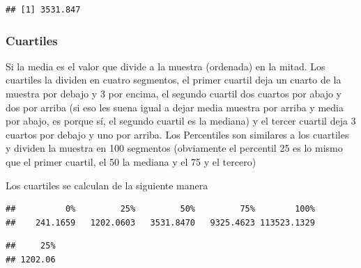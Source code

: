 \documentclass[
]{book}
\newenvironment{Shaded}{\begin{snugshade}}{\end{snugshade}}
\newcommand{\CommentTok}[1]{\textcolor[rgb]{0.56,0.35,0.01}{\textit{#1}}}
\newcommand{\FloatTok}[1]{\textcolor[rgb]{0.00,0.00,0.81}{#1}}
\newcommand{\FunctionTok}[1]{\textcolor[rgb]{0.00,0.00,0.00}{#1}}
\newcommand{\NormalTok}[1]{#1}
\newcommand{\SpecialCharTok}[1]{\textcolor[rgb]{0.00,0.00,0.00}{#1}}
\begin{document}
\begin{verbatim}
## [1] 3531.847
\end{verbatim}

\hypertarget{cuartiles}{%
\subsubsection{Cuartiles}\label{cuartiles}}

Si la media es el valor que divide a la muestra (ordenada) en la mitad. Los cuartiles la dividen en cuatro segmentos, el primer cuartil deja un cuarto de la muestra por debajo y 3 por encima, el segundo cuartil dos cuartos por abajo y dos por arriba (si eso les suena igual a dejar media muestra por arriba y media por abajo, es porque sí, el segundo cuartil es la mediana) y el tercer cuartil deja 3 cuartos por debajo y uno por arriba.
Los Percentiles son similares a los cuartiles y dividen la muestra en 100 segmentos (obviamente el percentil 25 es lo mismo que el primer cuartil, el 50 la mediana y el 75 y el tercero)

Los cuartiles se calculan de la siguiente manera

\begin{Shaded}
\end{Shaded}

\begin{verbatim}
##          0%         25%         50%         75%        100% 
##    241.1659   1202.0603   3531.8470   9325.4623 113523.1329
\end{verbatim}

\begin{Shaded}
\end{Shaded}

\begin{verbatim}
##     25% 
## 1202.06
\end{verbatim}

\begin{Shaded}
\end{Shaded}
\end{document}
